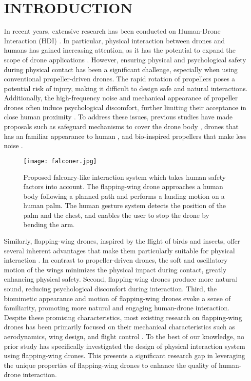 \section{INTRODUCTION}
In recent years, extensive research has been conducted on Human-Drone Interaction (HDI) \cite{Tezza2019HDI-Survey}.
In particular, physical interaction between drones and humans has gained increasing attention, as it has the potential to expand the scope of drone applications \cite{Knierim2017virtual-reality-tactile-drones, Nitta2014hoverball}. 
However, ensuring physical and psychological safety during physical contact has been a significant challenge, especially when using conventional propeller-driven drones.  
The rapid rotation of propellers poses a potential risk of injury, making it difficult to design safe and natural interactions. 
Additionally, the high-frequency noise and mechanical appearance of propeller drones often induce psychological discomfort, further limiting their acceptance in close human proximity \cite{schaffer2021drone-noise-impact,Yeh2017Proxemics} .
To address these issues, previous studies have made proposals such as 
safeguard mechanisms to cover the drone body \cite{Atahi2017touch-based}, 
drones that has an familiar appearance to human \cite{Yeh2017Proxemics},
and bio-inspired propellers that make less noise \cite{noda2018development-of-low-noise-propeller}.

\begin{figure}
    \centering
    \texttt{[image: falconer.jpg]}
    \caption{Proposed falconry-like interaction system which takes human safety factors into account. 
    The flapping-wing drone approaches a human body following a planned path and performs a landing motion on a human palm.
    The human gesture system detects the position of the palm and the chest, and enables the user to stop the drone by bending the arm.}
    \label{fig:falconer}
\end{figure}

Similarly, flapping-wing drones, inspired by the flight of birds and insects, offer several inherent advantages that make them particularly suitable for physical interaction \cite{de2020flapping}.  
In contrast to propeller-driven drones, the soft and oscillatory motion of the wings minimizes the physical impact during contact, greatly enhancing physical safety.  
Second, flapping-wing drones produce more natural sound, reducing psychological discomfort during interaction.  
Third, the biomimetic appearance and motion of flapping-wing drones evoke a sense of familiarity, promoting more natural and engaging human-drone interaction.  
Despite these promising characteristics, most existing research on flapping-wing drones has been primarily focused on their mechanical characteristics such as aerodynamics, wing design, and flight control \cite{billingsley2021aerodynamic,rifai2008flapping-control,chin2020efficient-flapping}.
To the best of our knowledge, no prior study has specifically investigated the design of physical interaction system using flapping-wing drones.  
This presents a significant research gap in leveraging the unique properties of flapping-wing drones to enhance the quality of human-drone interaction.

